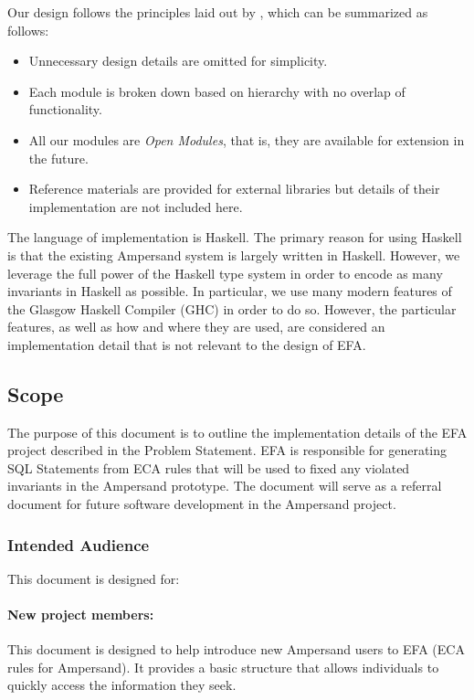 \documentclass[12pt, svgnames]{article}
\let\Oldsubsection\subsection
\renewcommand{\subsection}{\FloatBarrier\Oldsubsection}
\let\Oldsubsubsection\subsubsection
\renewcommand{\subsubsection}{\FloatBarrier\Oldsubsubsection}
\begin{document}
Our design follows the principles laid out by \citep{modStruct}, which can be summarized as follows:
\begin{itemize}
\item Unnecessary design details are omitted for simplicity.
\item Each module is broken down based on hierarchy with no overlap of functionality.
\item All our modules are \emph{Open Modules}, that is, they are available for extension in the future.
\item Reference materials are provided for external libraries but details of
  their implementation are not included here. 
\end{itemize}

The language of implementation is Haskell. The primary reason for using Haskell
is that the existing Ampersand system is largely written in Haskell. However, we
leverage the full power of the Haskell type system in order to encode as many
invariants in Haskell as possible. In particular, we use many modern features of
the Glasgow Haskell Compiler (GHC) in order to do so. However, the particular
features, as well as how and where they are used, are considered an
implementation detail that is not relevant to the design of EFA.

\subsection{Scope}
The purpose of this document is to outline the implementation details of the 
EFA project described in the Problem Statement.
EFA is responsible for generating SQL Statements from ECA rules that will 
be used to fixed any violated invariants in the Ampersand prototype. 
The document will serve as a referral document for future software development in the Ampersand project.

\subsubsection{Intended Audience}
This document is designed for:
\paragraph{New project members:}
This document is designed to help introduce new Ampersand users to EFA 
(ECA rules for Ampersand). It provides a basic structure that allows 
individuals to quickly access the information they seek.
   
\end{document}
